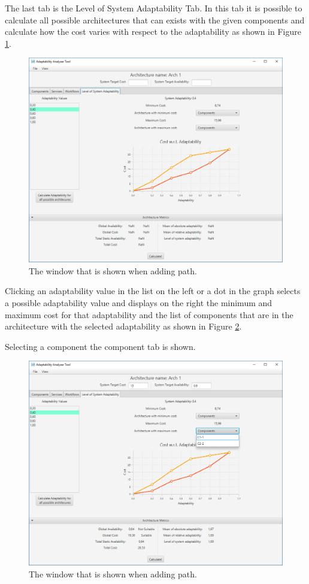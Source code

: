 The last tab is the Level of System Adaptability Tab. In this tab it is possible to calculate all possible architectures that can exists with the given components and calculate how the cost varies with respect to the adaptability as shown in Figure \ref{fig:adapt-wrt-avail}. 

\begin{figure}[!h]
	\centerline
	{\includegraphics[scale=0.50]{img/adapt_wrt_avail.png}}
	\caption[Add path window]{The window that is shown when adding path.}
	\label{fig:adapt-wrt-avail}
\end{figure}

Clicking an adaptability value in the list on the left or a dot in the graph selects a possible adaptability value and displays on the right the minimum and maximum cost for that adaptability and the list of components that are in the architecture with the selected adaptability as shown in Figure \ref{fig:adapt-wrt-avail-comp}. 

Selecting a component the component tab is shown.

\begin{figure}[!h]
	\centerline
	{\includegraphics[scale=0.50]{img/adapt_wrt_avail_comp.png}}
	\caption[Add path window]{The window that is shown when adding path.}
	\label{fig:adapt-wrt-avail-comp}
\end{figure}